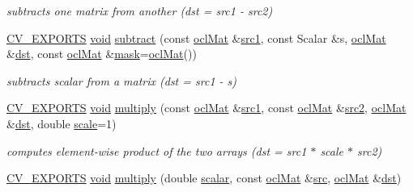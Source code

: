 \begin{DoxyCompactItemize}
\begin{DoxyCompactList}\small\item\em subtracts one matrix from another (dst = src1 -\/ src2) \end{DoxyCompactList}\item 
\hyperlink{core_2types__c_8h_a1bf9f0e121b54272da02379cfccd0a2b}{C\-V\-\_\-\-E\-X\-P\-O\-R\-T\-S} \hyperlink{legacy_8hpp_a8bb47f092d473522721002c86c13b94e}{void} \hyperlink{namespacecv_1_1ocl_a9c8d18c24595126f5dc09b6b877a606f}{subtract} (const \hyperlink{classcv_1_1ocl_1_1oclMat}{ocl\-Mat} \&\hyperlink{core__c_8h_a897de4702c922f4cccda0d57ccdcafb3}{src1}, const Scalar \&s, \hyperlink{classcv_1_1ocl_1_1oclMat}{ocl\-Mat} \&\hyperlink{photo__c_8h_aed13e2a25279b24dc954073233fef7a5}{dst}, const \hyperlink{classcv_1_1ocl_1_1oclMat}{ocl\-Mat} \&\hyperlink{tracking_8hpp_a6b13ecd2fd6ec7ad422f1d7863c3ad19}{mask}=\hyperlink{classcv_1_1ocl_1_1oclMat}{ocl\-Mat}())
\begin{DoxyCompactList}\small\item\em subtracts scalar from a matrix (dst = src1 -\/ s) \end{DoxyCompactList}\item 
\hyperlink{core_2types__c_8h_a1bf9f0e121b54272da02379cfccd0a2b}{C\-V\-\_\-\-E\-X\-P\-O\-R\-T\-S} \hyperlink{legacy_8hpp_a8bb47f092d473522721002c86c13b94e}{void} \hyperlink{namespacecv_1_1ocl_a19ac46587e0a270ce8bc37cbbbbefa07}{multiply} (const \hyperlink{classcv_1_1ocl_1_1oclMat}{ocl\-Mat} \&\hyperlink{core__c_8h_a897de4702c922f4cccda0d57ccdcafb3}{src1}, const \hyperlink{classcv_1_1ocl_1_1oclMat}{ocl\-Mat} \&\hyperlink{core__c_8h_a7561a36d48069d54a6c8ac4e4750edfd}{src2}, \hyperlink{classcv_1_1ocl_1_1oclMat}{ocl\-Mat} \&\hyperlink{photo__c_8h_aed13e2a25279b24dc954073233fef7a5}{dst}, double \hyperlink{objdetect_8hpp_a1f622eb9b9e06b30862ca90cdf2c078b}{scale}=1)
\begin{DoxyCompactList}\small\item\em computes element-\/wise product of the two arrays (dst = src1 $\ast$ scale $\ast$ src2) \end{DoxyCompactList}\item 
\hyperlink{core_2types__c_8h_a1bf9f0e121b54272da02379cfccd0a2b}{C\-V\-\_\-\-E\-X\-P\-O\-R\-T\-S} \hyperlink{legacy_8hpp_a8bb47f092d473522721002c86c13b94e}{void} \hyperlink{namespacecv_1_1ocl_a5cab53001d1a6e1903ba3d160b4f3947}{multiply} (double \hyperlink{core__c_8h_a7f559b13437c36e86baab8e221384f96}{scalar}, const \hyperlink{classcv_1_1ocl_1_1oclMat}{ocl\-Mat} \&\hyperlink{legacy_8hpp_a371cd109b74033bc4366f584edd3dacc}{src}, \hyperlink{classcv_1_1ocl_1_1oclMat}{ocl\-Mat} \&\hyperlink{photo__c_8h_aed13e2a25279b24dc954073233fef7a5}{dst})

\end{DoxyCompactItemize}
